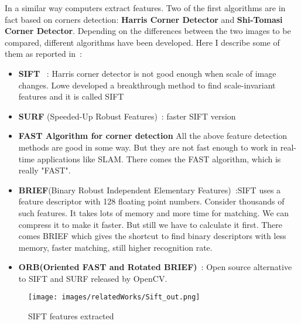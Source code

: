 In a similar way computers extract features. Two of the first algorithms are in fact based on corners detection: 
\textbf{Harris Corner Detector} and \textbf{Shi-Tomasi Corner Detector}.
Depending on the differences between the two images to be compared, different algorithms have been developed. Here I describe 
some of them as reported in~\cite{open_cv}:
\begin{itemize}
    \item \textbf{SIFT} ~\cite{Lowe04_SIFT}: Harris corner detector is not good enough when scale of image changes. Lowe developed a breakthrough 
    method to find scale-invariant features and it is called SIFT
    \item \textbf{SURF} (Speeded-Up Robust Features)~\cite{BAY_SURF}: faster SIFT version
    \item \textbf{FAST Algorithm for corner detection} All the above feature detection methods are good in some way. But they 
    are not fast enough to work in real-time applications like SLAM. There comes the FAST algorithm, which is really "FAST".
    \item \textbf{BRIEF}(Binary Robust Independent Elementary Features)~\cite{Brief}:SIFT uses a feature descriptor with 128 floating point numbers.
     Consider thousands of such features. It takes lots of memory and more time for matching. We can compress it to make it
    faster. But still we have to calculate it first. There comes BRIEF which gives the shortcut to find binary descriptors with less memory, faster matching, still higher recognition rate.
    \item \textbf{ORB(Oriented FAST and Rotated BRIEF)}~\cite{ORB}: Open source alternative to SIFT and SURF released by OpenCV.
\end{itemize}
\begin{figure}
    \centerline{
    \texttt{[image: images/relatedWorks/Sift\_out.png]}} %
    \caption{SIFT features extracted}
    \label{fig:sift}
\end{figure}


